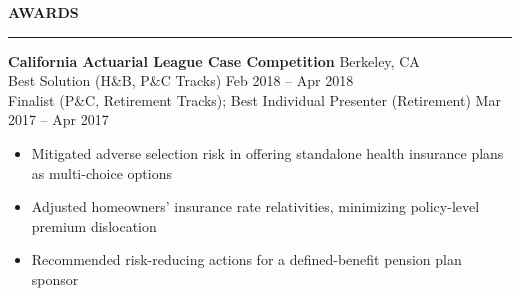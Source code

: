 \documentclass[11pt,letterpaper]{article}
\newcommand{\sectline}{\vspace{4pt}\hrule height 1.5pt\vspace{4pt}}
\begin{document}
\textbf{AWARDS} \sectline

\textbf{California Actuarial League Case Competition} \hfill Berkeley, CA \\
Best Solution (H\&B, P\&C Tracks) \hfill Feb 2018 -- Apr 2018 \\
Finalist (P\&C, Retirement Tracks); Best Individual Presenter (Retirement) \hfill Mar 2017 -- Apr 2017 
\begin{itemize}
	\item Mitigated adverse selection risk in offering standalone health insurance plans as multi-choice options
	\item Adjusted homeowners' insurance rate relativities, minimizing policy-level premium dislocation 
	\item Recommended risk-reducing actions for a defined-benefit pension plan sponsor
\end{itemize}

%
\end{document}
